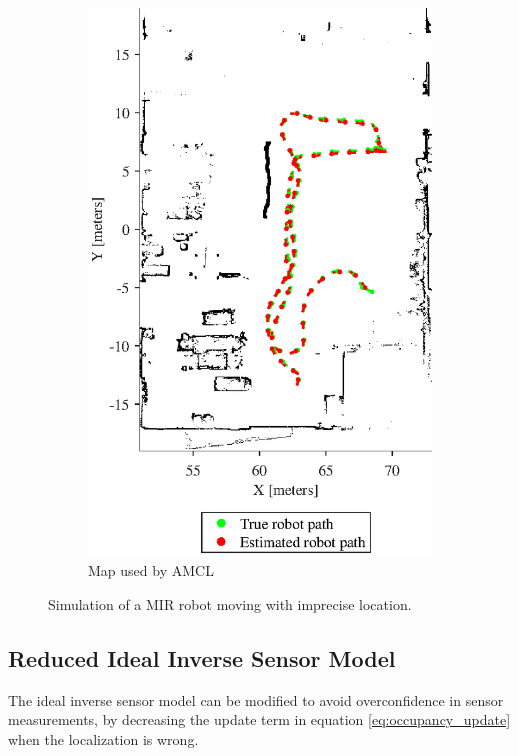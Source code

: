 \begin{figure}[htbp]
\begin{subfigure}[t]{0.45\textwidth}
		\includegraphics[width=\textwidth]{figures/static_mapping/simulation_poses_amcl_map}
		\caption{Map used by AMCL}
		\label{fig:simulated_small_amcl_map}
	\end{subfigure}
	\caption{Simulation of a MIR robot moving with imprecise location.}
	\label{fig:test_map_setup}
\end{figure}


\subsection{Reduced Ideal Inverse Sensor Model}
\label{sec:reduced_ideal_sensor_model}
The ideal inverse sensor model can be modified to avoid overconfidence in sensor measurements, by decreasing the update term in equation \ref{eq:occupancy_update} when the localization is wrong. 

